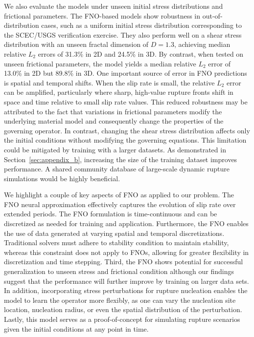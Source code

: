 \documentclass[draft]{agujournal2019}
\begin{document}
We also evaluate the models under unseen initial stress distributions and frictional parameters. The FNO-based models show robustness in out-of-distribution cases, such as a uniform initial stress distribution corresponding to the SCEC/USGS verification exercise. They also perform well on a shear stress distribution with an unseen fractal dimension of \(D = 1.3\), achieving median relative \(L_2\) errors of 31.3\% in 2D and 24.5\% in 3D. By contrast, when tested on unseen frictional parameters, the model yields a median relative \(L_2\) error of 13.0\% in 2D but 89.8\% in 3D. One important source of error in FNO predictions is spatial and temporal shifts. When the slip rate is small, the relative \(L_2\) error can be amplified, particularly where sharp, high-value rupture fronts shift in space and time relative to small slip rate values. This reduced robustness may be attributed to the fact that variations in frictional parameters modify the underlying material model and consequently change the properties of the governing operator. In contrast, changing the shear stress distribution affects only the initial conditions without modifying the governing equations. This limitation could be mitigated by training with a larger datasets. As demonstrated in Section~\ref{sec:appendix_b}, increasing the size of the training dataset improves performance. A shared community database of large-scale dynamic rupture simulations would be highly beneficial.

We highlight a couple of key aspects of FNO as applied to our problem. The FNO neural approximation effectively captures the evolution of slip rate over extended periods. The FNO formulation is time-continuous and can be discretized as needed for training and application. Furthermore, the FNO enables the use of data generated at varying spatial and temporal discretizations. Traditional solvers must adhere to stability condition to maintain stability, whereas this constraint does not apply to FNOs, allowing for greater flexibility in discretization and time stepping. Third, the FNO shows potential for successful generalization to unseen stress and frictional condition although our findings suggest that the performance will further improve by training on larger data sets. In addition, incorporating stress perturbations for rupture nucleation enables the model to learn the operator more flexibly, as one can vary the nucleation site location, nucleation radius, or even the spatial distribution of the perturbation. Lastly, this model serves as a proof-of-concept for simulating rupture scenarios given the initial conditions at any point in time.
\end{document}
